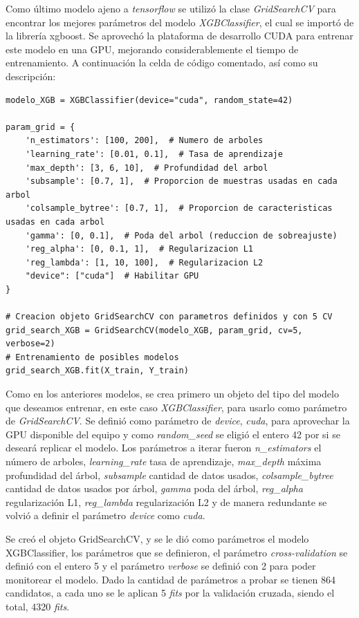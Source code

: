 Como último modelo ajeno a \textit{tensorflow} se utilizó la clase \textit{GridSearchCV} para encontrar los mejores parámetros del modelo \textit{XGBClassifier}, el cual se importó de la librería xgboost. Se aprovechó la plataforma de desarrollo CUDA para entrenar este modelo en una GPU, mejorando considerablemente el tiempo de entrenamiento. A continuación la celda de código comentado, así como su descripción: \\

\begin{lstlisting}[caption={Código \textit{GridSearchCV} para \textit{XGBClassifier}}]
modelo_XGB = XGBClassifier(device="cuda", random_state=42)

param_grid = {
    'n_estimators': [100, 200],  # Numero de arboles
    'learning_rate': [0.01, 0.1],  # Tasa de aprendizaje
    'max_depth': [3, 6, 10],  # Profundidad del arbol
    'subsample': [0.7, 1],  # Proporcion de muestras usadas en cada arbol
    'colsample_bytree': [0.7, 1],  # Proporcion de caracteristicas usadas en cada arbol
    'gamma': [0, 0.1],  # Poda del arbol (reduccion de sobreajuste)
    'reg_alpha': [0, 0.1, 1],  # Regularizacion L1
    'reg_lambda': [1, 10, 100],  # Regularizacion L2
    "device": ["cuda"]  # Habilitar GPU
}

# Creacion objeto GridSearchCV con parametros definidos y con 5 CV
grid_search_XGB = GridSearchCV(modelo_XGB, param_grid, cv=5, verbose=2)  
# Entrenamiento de posibles modelos
grid_search_XGB.fit(X_train, Y_train)
\end{lstlisting}

Como en los anteriores modelos, se crea primero un objeto del tipo del modelo que deseamos entrenar, en este caso \textit{XGBClassifier}, para usarlo como parámetro de \textit{GridSearchCV}. Se definió como parámetro de \textit{device}, \textit{cuda}, para aprovechar la GPU disponible del equipo y como \textit{random\_seed} se eligió el entero 42 por si se deseará replicar el modelo. Los parámetros a iterar fueron \textit{n\_estimators} el número de arboles, \textit{learning\_rate} tasa de aprendizaje, \textit{max\_depth} máxima profundidad del árbol, \textit{subsample} cantidad de datos usados, \textit{colsample\_bytree} cantidad de datos usados por árbol, \textit{gamma} poda del árbol, \textit{reg\_alpha} regularización L1, \textit{reg\_lambda} regularización L2 y de manera redundante se volvió a definir el parámetro \textit{device} como \textit{cuda}.

Se creó el objeto GridSearchCV, y se le dió como parámetros el modelo XGBClassifier, los parámetros que se definieron, el parámetro \textit{cross-validation} se definió con el entero 5 y el parámetro \textit{verbose} se definió con 2 para poder monitorear el modelo. Dado la cantidad de parámetros a probar se tienen 864 candidatos, a cada uno se le aplican 5 \textit{fits} por la validación cruzada, siendo el total, 4320 \textit{fits}.

